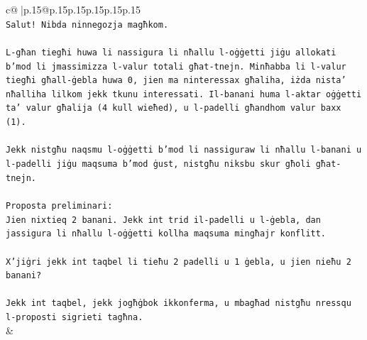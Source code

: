 \documentclass{article}
\begin{document}
{\begin{supertabular}{c@{$\;$}|p{.15\linewidth}@{}p{.15\linewidth}p{.15\linewidth}p{.15\linewidth}p{.15\linewidth}p{.15\linewidth}}
{{{\\ 
\texttt{Salut! Nibda ninnegozja magħkom.} \\
\\ 
\texttt{L{-}għan tiegħi huwa li nassigura li nħallu l{-}oġġetti jiġu allokati b'mod li jmassimizza l{-}valur totali għat{-}tnejn. Minħabba li l{-}valur tiegħi għall{-}ġebla huwa 0, jien ma ninteressax għaliha, iżda nista' nħalliha lilkom jekk tkunu interessati. Il{-}banani huma l{-}aktar oġġetti ta' valur għalija (4 kull wieħed), u l{-}padelli għandhom valur baxx (1).} \\
\\ 
\texttt{Jekk nistgħu naqsmu l{-}oġġetti b'mod li nassiguraw li nħallu l{-}banani u l{-}padelli jiġu maqsuma b'mod ġust, nistgħu niksbu skur għoli għat{-}tnejn.} \\
\\ 
\texttt{Proposta preliminari:} \\
\texttt{Jien nixtieq 2 banani. Jekk int trid il{-}padelli u l{-}ġebla, dan jassigura li nħallu l{-}oġġetti kollha maqsuma mingħajr konflitt.} \\
\\ 
\texttt{X'jiġri jekk int taqbel li tieħu 2 padelli u 1 ġebla, u jien nieħu 2 banani?} \\
\\ 
\texttt{Jekk int taqbel, jekk jogħġbok ikkonferma, u mbagħad nistgħu nressqu l{-}proposti sigrieti tagħna.} \\
            }
        }
    }
    & \\ \\


\end{supertabular}}
\end{document}
